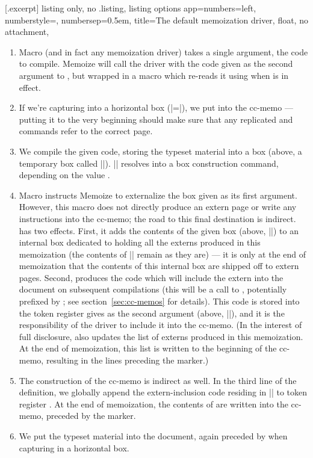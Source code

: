 \documentclass[a4paper,11pt]{article}
\begin{document}
[.excerpt]{%
  listing only, no .listing,
  listing options app={numbers=left, numberstyle=\tiny, numbersep=0.5em},
  title=The default memoization driver,
  float, no attachment,
}

\begin{enumerate}
\item Macro  (and in fact any memoization
  driver) takes a single argument, the code to compile.  Memoize will call the
  driver with the code given as the second argument to , but
  wrapped in a macro which re-reads it using  when
   is in effect.
\item If we're capturing into a horizontal box
  (|=|), we put  into
  the cc-memo --- putting it to the very beginning should make sure that any
  replicated  and  commands refer to the correct page.
\item We compile the given code, storing the typeset material into a box
  (above, a temporary box called |\mmz@box|).  |\mmz@capture| resolves into a
  box construction command, depending on the value .
\item Macro  instructs Memoize to externalize the box
  given as its first argument.  However, this macro does not directly produce
  an extern page or write any instructions into the cc-memo; the road to this
  final destination is indirect.   has two effects.
  First, it adds the contents of the given box (above, |\mmz@box|) to an
  internal box dedicated to holding all the externs produced in this
  memoization (the contents of |\mmz@box| remain as they are) --- it is only at
  the end of memoization that the contents of this internal box are shipped off
  to extern pages.  Second,  produces the code which
  will include the extern into the document on subsequent compilations (this
  will be a call to , potentially prefixed by
  ; see section~\ref{sec:cc-memos} for details).  This code
  is stored into the token register gives as the second argument (above,
  |\mmz@temptoks|), and it is the responsibility of the driver to include it
  into the cc-memo.  (In the interest of full disclosure,
   also updates the list of externs produced in this
  memoization.  At the end of memoization, this list is written to the
  beginning of the cc-memo, resulting in the  lines
  preceding the  marker.)
\item The construction of the cc-memo is indirect as well.  In the third line
  of the definition, we globally append the extern-inclusion code residing in
  |\mmz@temptoks| to token register .  At the end of
  memoization, the contents of  are written into the cc-memo,
  preceded by the  marker.
\item We put the typeset material into the document, again preceded by
   when capturing in a horizontal box.
\end{enumerate}
\end{document}
